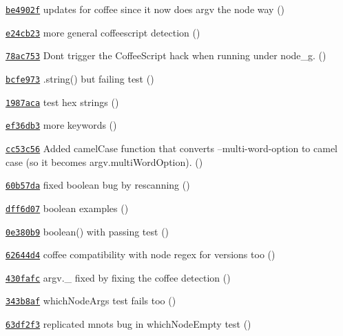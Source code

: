 \begin{DoxyItemize}
\item \href{https://github.com/bcoe/yargs/commit/be4902ff0961ae8feb9093f2c0a4066463ded2cf}{\tt be4902f} updates for coffee since it now does argv the node way ()
\item \href{https://github.com/bcoe/yargs/commit/e24cb23798ee64e53b60815e7fda78b87f42390c}{\tt e24cb23} more general coffeescript detection ()
\item \href{https://github.com/bcoe/yargs/commit/78ac753e5d0ec32a96d39d893272afe989e42a4d}{\tt 78ac753} Don\textquotesingle{}t trigger the Coffee\+Script hack when running under node\+\_\+g. ()
\item \href{https://github.com/bcoe/yargs/commit/bcfe9731d7f90d4632281b8a52e8d76eb0195ae6}{\tt bcfe973} .string() but failing test ()
\item \href{https://github.com/bcoe/yargs/commit/1987aca28c7ba4e8796c07bbc547cb984804c826}{\tt 1987aca} test hex strings ()
\item \href{https://github.com/bcoe/yargs/commit/ef36db32259b0b0d62448dc907c760e5554fb7e7}{\tt ef36db3} more keywords ()
\item \href{https://github.com/bcoe/yargs/commit/cc53c56329960bed6ab077a79798e991711ba01d}{\tt cc53c56} Added camel\+Case function that converts --multi-\/word-\/option to camel case (so it becomes argv.\+multi\+Word\+Option). ()
\item \href{https://github.com/bcoe/yargs/commit/60b57da36797716e5783a633c6d5c79099016d45}{\tt 60b57da} fixed boolean bug by rescanning ()
\item \href{https://github.com/bcoe/yargs/commit/dff6d078d97f8ac503c7d18dcc7b7a8c364c2883}{\tt dff6d07} boolean examples ()
\item \href{https://github.com/bcoe/yargs/commit/0e380b92c4ef4e3c8dac1da18b5c31d85b1d02c9}{\tt 0e380b9} boolean() with passing test ()
\item \href{https://github.com/bcoe/yargs/commit/62644d4bffbb8d1bbf0c2baf58a1d14a6359ef07}{\tt 62644d4} coffee compatibility with node regex for versions too ()
\item \href{https://github.com/bcoe/yargs/commit/430fafcf1683d23774772826581acff84b456827}{\tt 430fafc} argv.\+\_\+ fixed by fixing the coffee detection ()
\item \href{https://github.com/bcoe/yargs/commit/343b8afefd98af274ebe21b5a16b3a949ec5429f}{\tt 343b8af} which\+Node\+Args test fails too ()
\item \href{https://github.com/bcoe/yargs/commit/63df2f371f31e63d7f1dec2cbf0022a5f08da9d2}{\tt 63df2f3} replicated mnot\textquotesingle{}s bug in which\+Node\+Empty test ()

\end{DoxyItemize}
